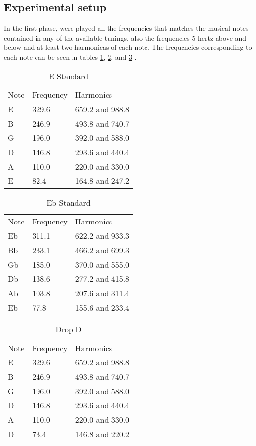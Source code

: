 \subsection{Experimental setup}
In the first phase, were played all the frequencies that matches the musical notes contained in any of the available tunings, also the frequencies 5 hertz above and below and at least two harmonicas of each note. The frequencies corresponding to each note can be seen in tables \ref{e_tuning}, \ref{eb_tuning}, and \ref{drop_d} .

\begin{table}[]
\centering
\caption{E Standard}
\label{e_tuning}
\begin{tabular}{lll}
Note & Frequency & Harmonics       \\
E    & 329.6     & 659.2 and 988.8 \\
B    & 246.9     & 493.8 and 740.7 \\
G    & 196.0     & 392.0 and 588.0 \\
D    & 146.8     & 293.6 and 440.4 \\
A    & 110.0     & 220.0 and 330.0 \\
E    & 82.4      & 164.8 and 247.2
\end{tabular}
\end{table}

\begin{table}[]
\centering
\caption{Eb Standard}
\label{eb_tuning}
\begin{tabular}{lll}
Note & Frequency & Harmonics       \\
Eb   & 311.1     & 622.2 and 933.3 \\
Bb   & 233.1     & 466.2 and 699.3 \\
Gb   & 185.0     & 370.0 and 555.0 \\
Db   & 138.6     & 277.2 and 415.8 \\
Ab   & 103.8     & 207.6 and 311.4 \\
Eb   & 77.8      & 155.6 and 233.4
\end{tabular}
\end{table}

\begin{table}[]
\centering
\caption{Drop D}
\label{drop_d}
\begin{tabular}{lll}
Note & Frequency & Harmonics       \\
E    & 329.6     & 659.2 and 988.8 \\
B    & 246.9     & 493.8 and 740.7 \\
G    & 196.0     & 392.0 and 588.0 \\
D    & 146.8     & 293.6 and 440.4 \\
A    & 110.0     & 220.0 and 330.0 \\
D    & 73.4      & 146.8 and 220.2
\end{tabular}
\end{table}


